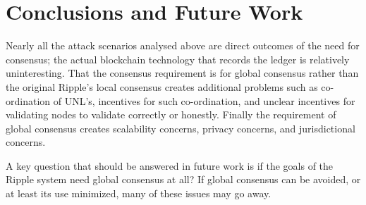 \documentclass{article}
\begin{document}
\section{Conclusions and Future Work}

Nearly all the attack scenarios analysed above are direct outcomes of the need
for consensus; the actual blockchain technology that records the ledger is
relatively uninteresting. That the consensus requirement is for global
consensus rather than the original Ripple's local consensus creates additional
problems such as co-ordination of UNL's, incentives for such co-ordination, and
unclear incentives for validating nodes to validate correctly or honestly.
Finally the requirement of global consensus creates scalability concerns,
privacy concerns, and jurisdictional concerns.

A key question that should be answered in future work is if the goals of the
Ripple system need global consensus at all? If global consensus can be avoided,
or at least its use minimized, many of these issues may go away.



\end{document}

